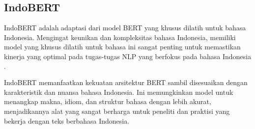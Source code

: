 \subsection{IndoBERT}

IndoBERT adalah adaptasi dari model BERT yang khusus dilatih untuk bahasa Indonesia. Mengingat keunikan dan kompleksitas bahasa Indonesia, memiliki model yang khusus dilatih untuk bahasa ini sangat penting untuk memastikan kinerja yang optimal pada tugas-tugas NLP yang berfokus pada bahasa Indonesia \parencite{indobert}.

IndoBERT memanfaatkan kekuatan arsitektur BERT sambil disesuaikan dengan karakteristik dan nuansa bahasa Indonesia. Ini memungkinkan model untuk menangkap makna, idiom, dan struktur bahasa dengan lebih akurat, menjadikannya alat yang sangat berharga untuk peneliti dan praktisi yang bekerja dengan teks berbahasa Indonesia.